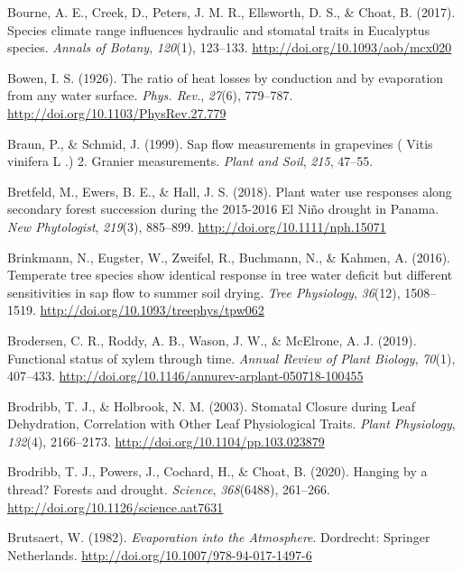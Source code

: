 \documentclass[11pt,twoside]{reedthesis}
\begin{document}
\hypertarget{ref-bourne_species_2017}{}
Bourne, A. E., Creek, D., Peters, J. M. R., Ellsworth, D. S., \& Choat,
B. (2017). Species climate range influences hydraulic and stomatal
traits in Eucalyptus species. \emph{Annals of Botany}, \emph{120}(1),
123--133. \url{http://doi.org/10.1093/aob/mcx020}

\hypertarget{ref-Bowen1926}{}
Bowen, I. S. (1926). The ratio of heat losses by conduction and by
evaporation from any water surface. \emph{Phys. Rev.}, \emph{27}(6),
779--787. \url{http://doi.org/10.1103/PhysRev.27.779}

\hypertarget{ref-Braun1999}{}
Braun, P., \& Schmid, J. (1999). Sap flow measurements in grapevines (
Vitis vinifera L .) 2. Granier measurements. \emph{Plant and Soil},
\emph{215}, 47--55.

\hypertarget{ref-bretfeld_plant_2018}{}
Bretfeld, M., Ewers, B. E., \& Hall, J. S. (2018). Plant water use
responses along secondary forest succession during the 2015-2016 El Niño
drought in Panama. \emph{New Phytologist}, \emph{219}(3), 885--899.
\url{http://doi.org/10.1111/nph.15071}

\hypertarget{ref-Brinkmann2016}{}
Brinkmann, N., Eugster, W., Zweifel, R., Buchmann, N., \& Kahmen, A.
(2016). Temperate tree species show identical response in tree water
deficit but different sensitivities in sap flow to summer soil drying.
\emph{Tree Physiology}, \emph{36}(12), 1508--1519.
\url{http://doi.org/10.1093/treephys/tpw062}

\hypertarget{ref-Brodersen2019}{}
Brodersen, C. R., Roddy, A. B., Wason, J. W., \& McElrone, A. J. (2019).
Functional status of xylem through time. \emph{Annual Review of Plant
Biology}, \emph{70}(1), 407--433.
\url{http://doi.org/10.1146/annurev-arplant-050718-100455}

\hypertarget{ref-brodribb_stomatal_2003}{}
Brodribb, T. J., \& Holbrook, N. M. (2003). Stomatal Closure during Leaf
Dehydration, Correlation with Other Leaf Physiological Traits.
\emph{Plant Physiology}, \emph{132}(4), 2166--2173.
\url{http://doi.org/10.1104/pp.103.023879}

\hypertarget{ref-Brodribb2020}{}
Brodribb, T. J., Powers, J., Cochard, H., \& Choat, B. (2020). Hanging
by a thread? Forests and drought. \emph{Science}, \emph{368}(6488),
261--266. \url{http://doi.org/10.1126/science.aat7631}

\hypertarget{ref-brutsaert_evaporation_1982}{}
Brutsaert, W. (1982). \emph{Evaporation into the Atmosphere}. Dordrecht:
Springer Netherlands. \url{http://doi.org/10.1007/978-94-017-1497-6}
\end{document}
